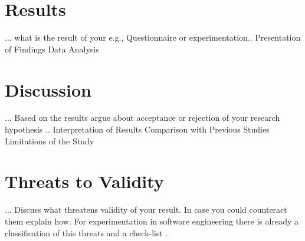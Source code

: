 \section{Results}
... what is the result of your e.g., Questionnaire or experimentation.. 
Presentation of Findings
Data Analysis

\section{Discussion}
... Based on the results argue about acceptance or rejection of your research hypothesis   .. 
Interpretation of Results
Comparison with Previous Studies
Limitations of the Study

\section{Threats to Validity}
... Discuss what threatens validity of your result. In case you could counteract them explain how. For experimentation in software engineering there is already a classification of this threats and a check-list \cite{DBLP:journals/ese/RunesonH09}.   

